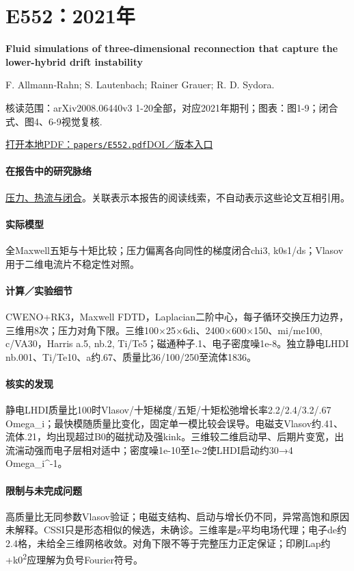 \documentclass[UTF8,a4paper,11pt,openany,fontset=fandol]{ctexbook}
\begin{document}
\section{E552：2021年}\label{paper:E552}

\textbf{Fluid simulations of three-dimensional reconnection that capture the lower-hybrid drift instability}\citep{E552}\

F. Allmann‐Rahn;  S. Lautenbach;  Rainer Grauer;  R. D. Sydora.

\textsf{核读范围：}arXiv2008.06440v3 1-20全部，对应2021年期刊；\textsf{图表：}图1-9；闭合式、图4、6-9视觉复核.

\href{run:../papers/E552.pdf}{打开本地PDF：\texttt{papers/E552.pdf}}\quad\href{https://doi.org/10.1017/s0022377820001683}{DOI／版本入口}

\paragraph{在报告中的研究脉络}\hyperref[story:closure]{压力、热流与闭合}。关联表示本报告的阅读线索，不自动表示这些论文互相引用。

\paragraph{实际模型}全Maxwell五矩与十矩比较；压力偏离各向同性的梯度闭合chi3, k0s1/ds；Vlasov用于二维电流片不稳定性对照。

\paragraph{计算／实验细节}CWENO+RK3，Maxwell FDTD，Laplacian二阶中心，每子循环交换压力边界，三维用8次；压力对角下限。三维100×25×6di、2400×600×150、mi/me100, c/VA30，Harris a.5, nb.2, Ti/Te5；磁通种子.1、电子密度噪1e-8。独立静电LHDI nb.001、Ti/Te10、a约.67、质量比36/100/250至流体1836。

\paragraph{核实的发现}静电LHDI质量比100时Vlasov/十矩梯度/五矩/十矩松弛增长率2.2/2.4/3.2/.67 Omega\_i；最快模随质量比变化，固定单一模比较会误导。电磁支Vlasov约.41、流体.21，均出现超过B0的磁扰动及强kink。三维较二维启动早、后期片变宽，出流湍动强而电子层相对适中；密度噪1e-10至1e-2使LHDI启动约30→4 Omega\_i\textasciicircum{}-1。

\paragraph{限制与未完成问题}高质量比无同参数Vlasov验证；电磁支结构、启动与增长仍不同，异常高饱和原因未解释。CSSI只是形态相似的候选，未确诊。三维率是z平均电场代理；电子de约2.4格，未给全三维网格收敛。对角下限不等于完整压力正定保证；印刷Lap约+k0\textsuperscript{2}应理解为负号Fourier符号。
\end{document}
